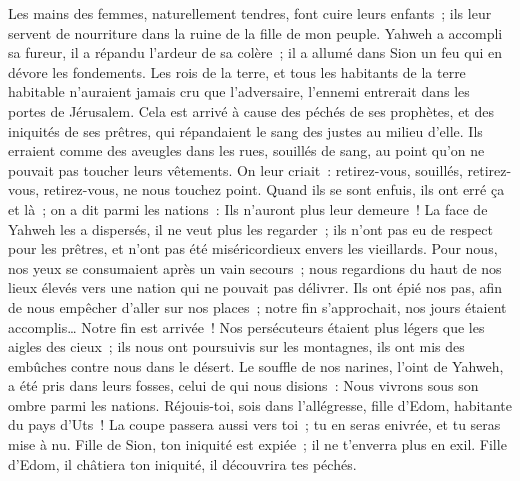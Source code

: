 \begin{multicols}{2}
 Les mains des femmes, naturellement tendres, font cuire leurs enfants~; ils leur servent de nourriture dans la ruine de la fille de mon peuple.
 Yahweh a accompli sa fureur, il a répandu l'ardeur de sa colère~; il a allumé dans Sion un feu qui en dévore les fondements.
 Les rois de la terre, et tous les habitants de la terre habitable n'auraient jamais cru que l'adversaire, l'ennemi entrerait dans les portes de Jérusalem.
 Cela est arrivé à cause des péchés de ses prophètes, et des iniquités de ses prêtres, qui répandaient le sang des justes au milieu d'elle.
 Ils erraient comme des aveugles dans les rues, souillés de sang, au point qu'on ne pouvait pas toucher leurs vêtements.
 On leur criait~: retirez-vous, souillés, retirez-vous, retirez-vous, ne nous touchez point. Quand ils se sont enfuis, ils ont erré ça et là~; on a dit parmi les nations~: Ils n'auront plus leur demeure~!
 La face de Yahweh les a dispersés, il ne veut plus les regarder~; ils n'ont pas eu de respect pour les prêtres, et n'ont pas été miséricordieux envers les vieillards.
 Pour nous, nos yeux se consumaient après un vain secours~; nous regardions du haut de nos lieux élevés vers une nation qui ne pouvait pas délivrer.
 Ils ont épié nos pas, afin de nous empêcher d'aller sur nos places~; notre fin s'approchait, nos jours étaient accomplis… Notre fin est arrivée~!
 Nos persécuteurs étaient plus légers que les aigles des cieux~; ils nous ont poursuivis sur les montagnes, ils ont mis des embûches contre nous dans le désert.
 Le souffle de nos narines, l'oint de Yahweh, a été pris dans leurs fosses, celui de qui nous disions~: Nous vivrons sous son ombre parmi les nations.
 Réjouis-toi, sois dans l'allégresse, fille d'Edom, habitante du pays d'Uts~! La coupe passera aussi vers toi~; tu en seras enivrée, et tu seras mise à nu.
 Fille de Sion, ton iniquité est expiée~; il ne t'enverra plus en exil. Fille d'Edom, il châtiera ton iniquité, il découvrira tes péchés.

\end{multicols}
